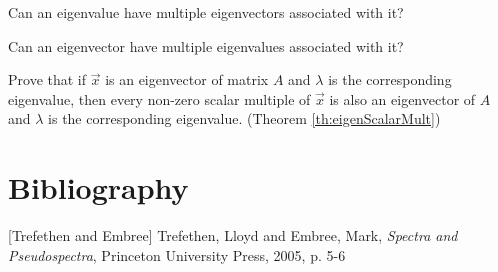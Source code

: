 \documentclass{ximera}
\begin{document}
\begin{problem}\label{prob:eigenmultchoice}
Can an eigenvalue have multiple eigenvectors associated with it? 
\begin{multipleChoice}
    \end{multipleChoice}
    
 Can an eigenvector have multiple eigenvalues associated with it?
 \begin{multipleChoice}
    \end{multipleChoice}
\end{problem}

\begin{problem}\label{prob:eigenScalarMult}
    Prove that if $\vec{x}$ is an eigenvector of matrix $A$ and $\lambda$ is the corresponding eigenvalue, then every non-zero scalar multiple of $\vec{x}$ is also an eigenvector of $A$ 
 and $\lambda$ is the corresponding eigenvalue. (Theorem \ref{th:eigenScalarMult})
\end{problem}

\section*{Bibliography}
[Trefethen and  Embree] Trefethen, Lloyd and Embree, Mark, {\it Spectra and Pseudospectra}, Princeton University Press, 2005, p. 5-6
\end{document}
